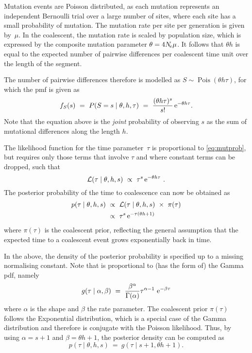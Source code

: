 Mutation events are Poisson distributed, as each mutation represents an independent Bernoulli trial over a large number of sites, where each site has a small probability of mutation.
The mutation rate per site per generation is given by~$\mu$.
In the coalescent, the mutation rate is scaled by population size, which is expressed by the composite mutation parameter ${\theta = 4N_{\!e}\mu}$.
It follows that ${\theta h}$ is equal to the expected number of pairwise differences per coalescent time unit over the length of the segment.

The number of pairwise differences therefore is modelled as ${S \sim \operatorname{Pois}(\theta h \tau)}$, for which the \gls{pmf} is given as
\begin{equation}\label{eq:mutprob}
	f_S(s)~=~P(S=s \mid \theta,h,\tau) ~=~ \frac{(\theta h \tau)^s}{s!} \,\mathrm{e}^{-\theta h \tau}\text{.}
\end{equation}
Note that the equation above is the \emph{joint} probability of observing $s$ as the sum of mutational differences along the length $h$.

The likelihood function for the time parameter~$\tau$ is proportional to \cref{eq:mutprob}, but requires only those terms that involve $\tau$ and where constant terms can be dropped, such that
\begin{equation}\label{eq:mut_like}
	\mathcal{L}(\tau \mid \theta,h,s) ~\propto~ \tau^s \,\mathrm{e}^{-\theta h \tau}\ .
\end{equation}
The posterior probability of the time to coalescence can now be obtained as
\begin{equation}\label{eq:mut_post}
\begin{split}
	p(\tau \mid \theta,h,s)
	&~\propto~ \mathcal{L}(\tau \mid \theta,h,s)~\times~\pi(\tau) \\
	&~\propto~ \tau^s \,\mathrm{e}^{- \tau (\theta h +1)}
\end{split}
\end{equation}
where $\pi(\tau)$ is the coalescent prior, reflecting the general assumption that the expected time to a coalescent event grows exponentially back in time.

In the above, the density of the posterior probability is specified up to a missing normalising constant.
Note that  is proportional to (has the form of) the Gamma \gls{pdf}, namely
\begin{equation*}
	g(\tau\mid\alpha,\beta)~=~\frac{\beta^\alpha}{\Gamma(\alpha)}\tau^{\alpha - 1}\,\,\mathrm{e}^{-\beta\tau}
\end{equation*}
where $\alpha$ is the shape and $\beta$ the rate parameter.
The coalescent prior $\pi(\tau)$ follows the Exponential distribution, which is a special case of the Gamma distribution and therefore is conjugate with the Poisson likelihood.
Thus, by using ${\alpha = s+1}$ and ${\beta = \theta h+1}$, the posterior density can be computed as
\begin{equation}
	p(\tau \mid \theta,h,s)~=~g(\tau\mid s+1, \theta h+1)\text{.}
\end{equation}





